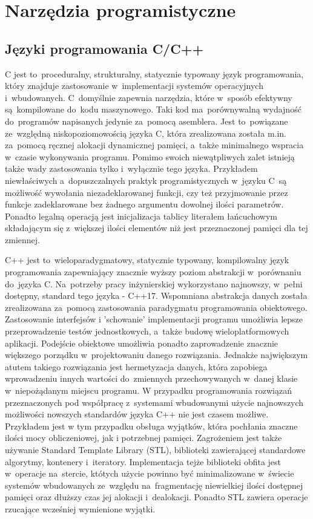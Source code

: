 \section{Narzędzia programistyczne} \label{sec:prog}

\subsection{Języki programowania C/C++} \label{sec:cpp}
C jest to~proceduralny, strukturalny, statycznie typowany język programowania, który znajduje
zastosowanie w~implementacji systemów operacyjnych i~wbudowanych. C~domyślnie zapewnia
narzędzia, które w~sposób efektywny są~kompilowane do~kodu maszynowego. Taki kod ma~porównywalną
wydajność do~programów napisanych jedynie za~pomocą asemblera. Jest to~powiązane ze~względną
niskopoziomowością języka C, która zrealizowana została m.in. za~pomocą ręcznej alokacji
dynamicznej pamięci, a~także minimalnego wspracia w~czasie wykonywania programu. 
Pomimo swoich niewątpliwych zalet istnieją także wady zastosowania tylko i~wyłącznie tego
języka. Przykładem niewłaściwych a~dopuszczalnych praktyk programistycznych w~języku C~są
możliwość wywołania niezadeklarowanej funkcji, czy też przyjmowanie przez funkcje zadeklarowane
bez żadnego argumentu dowolnej ilości parametrów. Ponadto legalną operacją jest inicjalizacja
tablicy literałem łańcuchowym składającym się z~większej ilości elementów niż jest przeznaczonej
pamięci dla tej zmiennej.

C++ jest to~wieloparadygmatowy, statycznie typowany, kompilowalny język programowania zapewniający
znacznie wyższy poziom abstrakcji w~porównaniu do~języka C. Na~potrzeby pracy inżynierskiej
wykorzystano najnowszy, w~pełni dostępny, standard tego języka - C++17. 
Wspomniana abstrakcja danych została
zrealizowana za~pomocą zastosowania paradygmatu programowania obiektowego. Zastosowanie interfejsów
i 'schowanie' implementacji programu umożliwia lepsze przeprowadzenie testów jednostkowych, a~także
budowę wieloplatformowych aplikacji. Podejście obiektowe umożliwia ponadto zaprowadzenie znacznie
większego porządku w~projektowaniu danego rozwiązania. Jednakże największym atutem takiego 
rozwiązania jest hermetyzacja danych, która zapobiega wprowadzeniu innych wartości do~zmiennych
przechowywanych w~danej klasie w~niepożądanym miejscu programu.
W przypadku programowania rozwiązań przeznaczonych pod współpracę z~systemami wbudowanymi użycie
najnowszych możliwości nowszych standardów języka C++ nie jest czasem możliwe. Przykładem jest
w tym przypadku obsługa wyjątków, która pochłania znaczne ilości mocy obliczeniowej, jak
i potrzebnej pamięci. Zagrożeniem jest także używanie Standard Template Library (STL), biblioteki
zawierającej standardowe algorytmy, kontenery i~iteratory. Implementacja tejże biblioteki obfita
jest w~operacje na~stercie, któtych użycie powinno być minimalizowane w~świecie systemów
wbudowanych ze~względu na~fragmentację niewielkiej ilości dostępnej pamięci oraz dłuższy czas
jej alokacji i~dealokacji. Ponadto STL zawiera operacje rzucające wcześniej wymienione wyjątki.
\cite{cpp_bjarne} 

